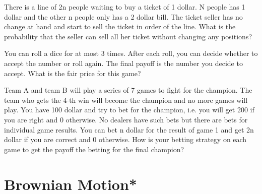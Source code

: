 \begin{exe}
There is a line of 2n people waiting to buy a ticket of 1 dollar. N people has 1 dollar and the other n people only has a 2 dollar bill. The ticket seller has no change at hand and start to sell the ticket in order of the line. What is the probability that the seller can sell all her ticket without changing any positions?
\end{exe}
\begin{teacher}
\begin{sol}
\end{sol}
\end{teacher}

\begin{exe}
You can roll a dice for at most 3 times. After each roll, you can decide whether to accept the number or roll again. The final payoff is the number you decide to accept. What is the fair price for this game?
\end{exe}
\begin{teacher}
\begin{sol}
\end{sol}
\end{teacher}

\begin{exe}
Team A and team B will play a series of 7 games to fight for the champion. The team who gets the 4-th win will become the champion and no more games will play. You have 100 dollar and try to bet for the champion, i.e. you will get 200 if you are right and 0 otherwise. No dealers have such bets but there are bets for individual game results. You can bet n dollar for the result of game 1 and get 2n dollar if you are correct and 0 otherwise. How is your betting strategy on each game to get the payoff the betting for the final champion?  
\end{exe}
\begin{teacher}
\begin{sol}
\end{sol}
\end{teacher}







\section{Brownian Motion*}
\begin{exe}

\end{exe}
\begin{teacher}
\begin{sol}
\end{sol}
\end{teacher}

